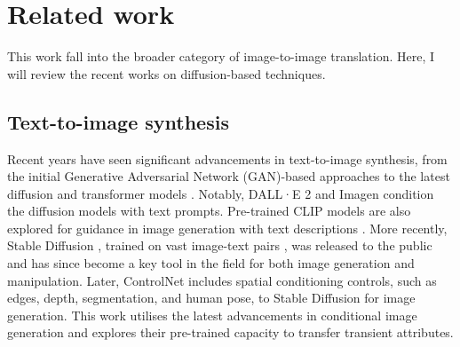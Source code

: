 \section{Related work}\label{zero-shot-RW}
This work fall into the broader category of image-to-image translation. Here, I will review the recent works on diffusion-based techniques.

\subsection{Text-to-image synthesis}

Recent years have seen significant advancements in text-to-image synthesis, from the initial Generative Adversarial Network (GAN)-based approaches \cite{li2020manigan,xu2018attngan,zhang2017stackgan,zhang2018stackgan++} to the latest diffusion \cite{gu2022vector,ho2020denoising,nichol2021improved,ramesh2022hierarchical,rombach2022high,saharia2022photorealistic,song2020denoising,zhang2023adding} and transformer models \cite{ding2022cogview2,esser2021taming,ramesh2021zero,yu2022scaling}. Notably, DALL·E 2 \cite{ramesh2022hierarchical} and Imagen \cite{ho2022imagen} condition the diffusion models with text prompts. Pre-trained CLIP models \cite{radford2021learning} are also explored for guidance in image generation with text descriptions \cite{crowson2022vqgan,ramesh2022hierarchical}. More recently, Stable Diffusion \cite{rombach2022high}, trained on vast image-text pairs \cite{schuhmann2021laion}, was released to the public and has since become a key tool in the field for both image generation and manipulation. Later, ControlNet \cite{zhang2023adding} includes spatial conditioning controls, such as edges, depth, segmentation, and human pose, to Stable Diffusion for image generation. This work utilises the latest advancements in conditional image generation and explores their pre-trained capacity to transfer transient attributes.



